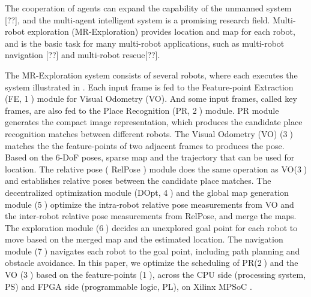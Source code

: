 \label{sec:intro}

The cooperation of agents can expand the capability of the unmanned system [??], and the multi-agent intelligent system is a promising research field.
Multi-robot exploration (MR-Exploration) \cite{corah2019communication} provides location and map for each robot, and is the basic task for many multi-robot applications, such as multi-robot navigation [??] and multi-robot rescue[??].

The  MR-Exploration system \cite{corah2019communication, cieslewski2018data} consists of several robots, where each executes the system illustrated in . Each input frame is fed to the Feature-point Extraction (FE, \textcircled{1}) module for Visual Odometry (VO). 
And some input frames, called key frames, are also fed to the Place Recognition (PR, \textcircled{2}) module.
PR module generates the compact image representation, which produces the candidate place recognition matches between different robots. The  Visual Odometry (VO) (\textcircled{3}) matches the the feature-points of two adjacent frames to produces the pose. Based on the 6-DoF poses,  sparse map and the trajectory that can be used for location. The relative pose ( RelPose ) module does the same operation as VO(\textcircled{3}) and establishes relative poses between the candidate place matches. The decentralized optimization module (DOpt, \textcircled{4}) and the global map generation module (\textcircled{5}) optimize the intra-robot relative pose measurements from VO and the inter-robot relative pose measurements from RelPose, and merge the maps. The exploration module (\textcircled{6}) decides an unexplored goal point for each robot to move based on the merged map and the estimated location. The navigation module (\textcircled{7}) navigates each robot to the goal point, including path planning and obstacle avoidance.
In this paper, we optimize the scheduling of PR(\textcircled{2}) and the VO (\textcircled{3}) based on the feature-points (\textcircled{1}), across the CPU side (processing system, PS) and FPGA side (programmable logic, PL), on Xilinx MPSoC \cite{MPSoC}.


